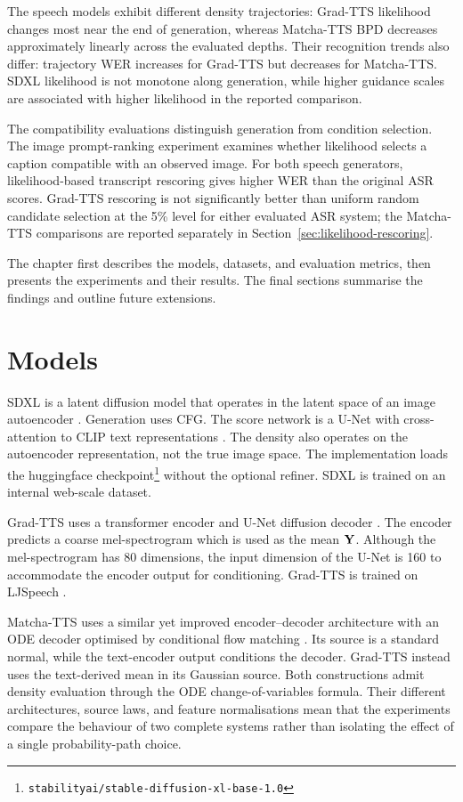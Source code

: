The speech models exhibit different density trajectories: Grad-TTS likelihood changes most near the end of generation, whereas Matcha-TTS \ac{BPD} decreases approximately linearly across the evaluated depths. Their recognition trends also differ: trajectory \ac{WER} increases for Grad-TTS but decreases for Matcha-TTS. SDXL likelihood is not monotone along generation, while higher guidance scales are associated with higher likelihood in the reported comparison.

The compatibility evaluations distinguish generation from condition selection. The image prompt-ranking experiment examines whether likelihood selects a caption compatible with an observed image. For both speech generators, likelihood-based transcript rescoring gives higher \ac{WER} than the original \ac{ASR} scores. Grad-TTS rescoring is not significantly better than uniform random candidate selection at the 5\% level for either evaluated \ac{ASR} system; the Matcha-TTS comparisons are reported separately in Section~\ref{sec:likelihood-rescoring}. 

The chapter first describes the models, datasets, and evaluation metrics, then presents the experiments and their results. The final sections summarise the findings and outline future extensions.

\section{Models}
\label{sec:likelihood-models}

SDXL is a latent diffusion model that operates in the latent space of an image autoencoder \citep{podellSDXLImprovingLatent2023}. Generation uses \ac{CFG}. The score network is a U-Net with cross-attention to CLIP text representations \citep{radfordLearningTransferableVisual2021}. The density also operates on the autoencoder representation, not the true image space. The implementation loads the huggingface checkpoint\footnote{\texttt{stabilityai/stable-diffusion-xl-base-1.0}} without the optional refiner. SDXL is trained on an internal web-scale dataset.

Grad-TTS uses a transformer encoder and U-Net diffusion decoder \citep{popov21gradtts}. The encoder predicts a coarse mel-spectrogram which is used as the mean ${\mathbf{Y}}$. Although the mel-spectrogram has 80 dimensions, the input dimension of the U-Net is 160 to accommodate the encoder output for conditioning. Grad-TTS is trained on LJSpeech \citep{LJSpeechDataset}.

Matcha-TTS uses a similar yet improved encoder--decoder architecture with an \ac{ODE} decoder optimised by conditional flow matching \citep{mehta2024matcha}. Its source is a standard normal, while the text-encoder output conditions the decoder. Grad-TTS instead uses the text-derived mean in its Gaussian source. Both constructions admit density evaluation through the \ac{ODE} change-of-variables formula. Their different architectures, source laws, and feature normalisations mean that the experiments compare the behaviour of two complete systems rather than isolating the effect of a single probability-path choice.

